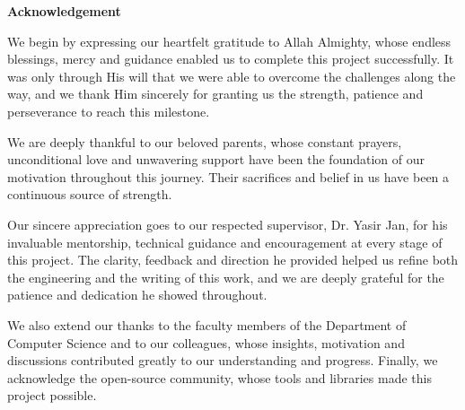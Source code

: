 \clearpage
\thispagestyle{plain}
\begin{center}
{\fontsize{16}{20}\bfseries Acknowledgement\par}
\end{center}
\vspace{0.2in}

We begin by expressing our heartfelt gratitude to Allah Almighty, whose endless
blessings, mercy and guidance enabled us to complete this project successfully. It was
only through His will that we were able to overcome the challenges along the way, and we
thank Him sincerely for granting us the strength, patience and perseverance to reach this
milestone.

We are deeply thankful to our beloved parents, whose constant prayers, unconditional
love and unwavering support have been the foundation of our motivation throughout this
journey. Their sacrifices and belief in us have been a continuous source of strength.

Our sincere appreciation goes to our respected supervisor, Dr. Yasir Jan, for his
invaluable mentorship, technical guidance and encouragement at every stage of this
project. The clarity, feedback and direction he provided helped us refine both the
engineering and the writing of this work, and we are deeply grateful for the patience and
dedication he showed throughout.

We also extend our thanks to the faculty members of the Department of Computer
Science and to our colleagues, whose insights, motivation and discussions contributed
greatly to our understanding and progress. Finally, we acknowledge the open-source
community, whose tools and libraries made this project possible.
